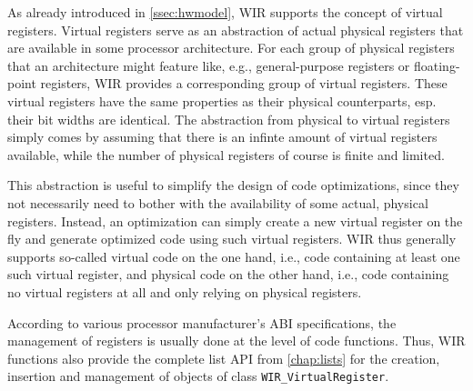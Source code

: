 As already introduced in \cref{ssec:hwmodel}, \gls{WIR} supports the concept of virtual registers.
Virtual registers serve as an abstraction of actual physical registers that are available in some processor architecture.
For each group of physical registers that an architecture might feature like, e.g., general-purpose registers or floating-point registers, \gls{WIR} provides a corresponding group of virtual registers.
These virtual registers have the same properties as their physical counterparts, esp. their bit widths are identical.
The abstraction from physical to virtual registers simply comes by assuming that there is an infinte amount of virtual registers available, while the number of physical registers of course is finite and limited.

This abstraction is useful to simplify the design of code optimizations, since they not necessarily need to bother with the availability of some actual, physical registers.
Instead, an optimization can simply create a new virtual register on the fly and generate optimized code using such virtual registers.
\gls{WIR} thus generally supports so-called virtual code on the one hand, i.e., code containing at least one such virtual register, and physical code on the other hand, i.e., code containing no virtual registers at all and only relying on physical registers.

According to various processor manufacturer's \gls{ABI} specifications, the management of registers is usually done at the level of code functions.
Thus, \gls{WIR} functions also provide the complete list \gls{API} from \cref{chap:lists} for the creation, insertion and management of objects of class \texttt{WIR\_VirtualRegister}.

